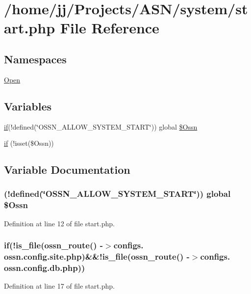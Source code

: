 \hypertarget{start_8php}{}\section{/home/jj/\+Projects/\+A\+S\+N/system/start.php File Reference}
\label{start_8php}
\subsection*{Namespaces}
\begin{DoxyCompactItemize}
\item 
 \hyperlink{namespace_open}{Open}
\end{DoxyCompactItemize}
\subsection*{Variables}
\begin{DoxyCompactItemize}
\item 
\hyperlink{jquery_8tokeninput_8js_ad8dd46a3cbc004569e34401e9e71771a}{if}(!defined(\char`\"{}O\+S\+S\+N\+\_\+\+A\+L\+L\+O\+W\+\_\+\+S\+Y\+S\+T\+E\+M\+\_\+\+S\+T\+A\+RT\char`\"{})) global \hyperlink{start_8php_afc08d502f777c77f55280d3bf612fb6c}{\$\+Ossn}
\item 
\hyperlink{start_8php_a7062214bd33a289c22762dc9f11d653e}{if} (!isset(\$Ossn))
\end{DoxyCompactItemize}


\subsection{Variable Documentation}
\subsubsection[{\texorpdfstring{\$\+Ossn}{$Ossn}}]{ (!defined(\char`\"{}O\+S\+S\+N\+\_\+\+A\+L\+L\+O\+W\+\_\+\+S\+Y\+S\+T\+E\+M\+\_\+\+S\+T\+A\+RT\char`\"{})) global \$Ossn}\hypertarget{start_8php_afc08d502f777c77f55280d3bf612fb6c}{}\label{start_8php_afc08d502f777c77f55280d3bf612fb6c}


Definition at line 12 of file start.\+php.

\subsubsection[{\texorpdfstring{if}{if}}]{\setlength{\rightskip}{0pt plus 5cm}if(!is\+\_\+file({\bf ossn\+\_\+route}() -\/$>$configs. \textquotesingle{}ossn.\+config.\+site.\+php\textquotesingle{})\&\&!is\+\_\+file({\bf ossn\+\_\+route}() -\/$>$configs. \textquotesingle{}ossn.\+config.\+db.\+php\textquotesingle{}))}\hypertarget{start_8php_a7062214bd33a289c22762dc9f11d653e}{}\label{start_8php_a7062214bd33a289c22762dc9f11d653e}


Definition at line 17 of file start.\+php.

